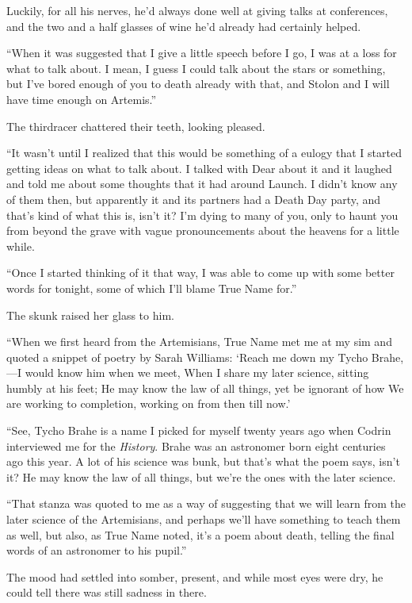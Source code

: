Luckily, for all his nerves, he'd always done well at giving talks at conferences, and the two and a half glasses of wine he'd already had certainly helped.

``When it was suggested that I give a little speech before I go, I was at a loss for what to talk about. I mean, I guess I could talk about the stars or something, but I've bored enough of you to death already with that, and Stolon and I will have time enough on Artemis.''

The thirdracer chattered their teeth, looking pleased.

``It wasn't until I realized that this would be something of a eulogy that I started getting ideas on what to talk about. I talked with Dear about it and it laughed and told me about some thoughts that it had around Launch. I didn't know any of them then, but apparently it and its partners had a Death Day party, and that's kind of what this is, isn't it? I'm dying to many of you, only to haunt you from beyond the grave with vague pronouncements about the heavens for a little while.

``Once I started thinking of it that way, I was able to come up with some better words for tonight, some of which I'll blame True Name for.''

The skunk raised her glass to him.

``When we first heard from the Artemisians, True Name met me at my sim and quoted a snippet of poetry by Sarah Williams: `Reach me down my Tycho Brahe,—I would know him when we meet, When I share my later science, sitting humbly at his feet; He may know the law of all things, yet be ignorant of how We are working to completion, working on from then till now.'

``See, Tycho Brahe is a name I picked for myself twenty years ago when Codrin interviewed me for the \emph{History}. Brahe was an astronomer born eight centuries ago this year. A lot of his science was bunk, but that's what the poem says, isn't it? He may know the law of all things, but we're the ones with the later science.

``That stanza was quoted to me as a way of suggesting that we will learn from the later science of the Artemisians, and perhaps we'll have something to teach them as well, but also, as True Name noted, it's a poem about death, telling the final words of an astronomer to his pupil.''

The mood had settled into somber, present, and while most eyes were dry, he could tell there was still sadness in there.

